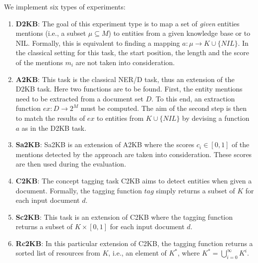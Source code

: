 We implement six types of experiments:
\begin{enumerate}
\item \textbf{D2KB}: The goal of this experiment type is to map a set of \emph{given} entities mentions (i.e., a subset $\mu \subseteq M$) to entities from a given knowledge base or to NIL. Formally, this is equivalent to finding a mapping $a: \mu \rightarrow K \cup \{NIL\}$. In the classical setting for this task, the start position, the length and the score of the mentions $m_i$ are not taken into consideration. 
\item \textbf{A2KB}: This task is the classical NER/D task, thus an extension of the D2KB task. Here two functions are to be found. First, the entity mentions need to be extracted from a document set $D$. To this end, an extraction function $ex: D \rightarrow 2^M$ must be computed. The aim of the second step is then to match the results of $ex$ to entities from $K \cup \{NIL\}$ by devising a function $a$ as in the D2KB task.
\item \textbf{Sa2KB}:
Sa2KB is an extension of A2KB where the scores $c_i \in [0,1]$ of the mentions detected by the approach are taken into consideration. These scores are then used during the evaluation.
\item \textbf{C2KB}: The concept tagging task C2KB aims to detect entities when given a document. Formally, the tagging function $tag$ simply returns a subset of $K$ for each input document $d$.
\item \textbf{Sc2KB}: This task is an extension of C2KB where the tagging function returns a subset of $K \times [0,1]$ for each input document $d$.
\item \textbf{Rc2KB}: In this particular extension of C2KB, the tagging function returns a sorted list of resources from $K$, i.e., an element of $K^*$, where $K^* = \bigcup\limits_{i=0}^\infty K^i$. 
\end{enumerate}

